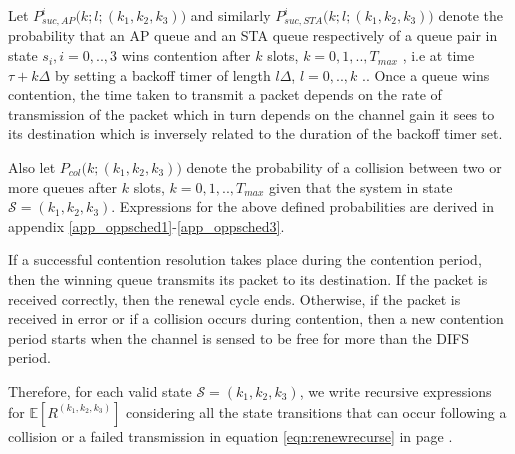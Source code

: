 \documentclass[10pt,conference]{IEEEtran}
\newcommand{\EX}{\mathbb{E}}
\newcommand{\pcol}{P_{col}}
\newcommand{\renew}{{R}}
\newcommand{\state}{\mathcal{S}}
\newcommand{\psucap}{P_{suc, AP}^{i}}
\newcommand{\psucsta}{P_{suc,STA}^{i}}
\begin{document}
  Let $\psucap\big(k;l;(k_{1},k_{2},k_{3})\big)$ and similarly $\psucsta\big(k;l;(k_{1},k_{2},k_{3})\big)$ denote the probability that an AP queue and an STA queue respectively of a queue pair in state $s_i, i=0,.., 3$ wins contention after $k$ slots, $k=0,1, .., T_{max}$ ,
 i.e at time $\tau+k\Delta$ by setting a backoff timer of length $l\Delta$, $l=0, .. , k$ .. Once a queue wins contention, the time taken to transmit a packet depends on the rate of transmission of the packet  which in turn depends on the channel gain it sees to its destination 
which is inversely related to the duration of the backoff timer set.
 


 Also let $\pcol\big(k;(k_{1},k_{2},k_{3})\big)$ denote the probability of a collision between two or more queues after $k$ slots, $k=0,1, .., T_{max}$  given that the system in state $\state=(k_{1},k_{2},k_{3})$.
Expressions for the above defined probabilities are derived in appendix \ref{app_oppsched1}-\ref{app_oppsched3}.

    If a successful contention resolution takes place during the contention period, then the winning queue transmits its packet to its destination. If the packet is received correctly, then the renewal cycle ends. Otherwise, if the packet is received in 
error or if a collision occurs during contention, then a new contention period starts when the channel is 
sensed to be free for more than the DIFS period. 


 Therefore, for each valid state $\state=(k_1, k_2, k_3)$, we write recursive expressions for $\EX[\renew^{(k_{1},k_{2},k_{3})}]$ considering all the state transitions that can occur following a collision or a failed transmission in equation \ref{eqn:renewrecurse} in page \pageref{eqn:renewrecurse}.
 
\end{document}

